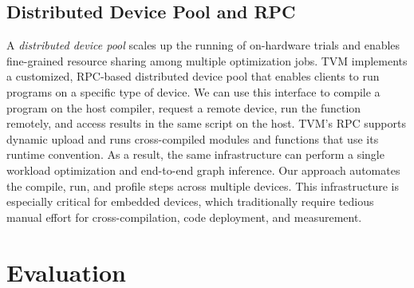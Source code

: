 \documentclass[letterpaper,twocolumn,10pt]{article}
\newcommand{\precap}{\vskip -0mm}
\newcommand{\postcap}{\vskip -0mm}
\newcommand{\TensorOpt}{TVM\xspace}
\begin{document}
\subsection{Distributed Device Pool and RPC}

A \textit{distributed device pool} scales up the running of on-hardware trials and enables fine-grained resource sharing among multiple optimization jobs.
\TensorOpt implements a customized, RPC-based distributed device pool that enables clients to run programs on a specific type of device.
We can use this interface to compile a program on the host compiler, request a remote device,
run the function remotely, and access results in the same script on the host.
\TensorOpt's RPC supports dynamic upload and runs cross-compiled modules and functions that use its runtime convention.
As a result, the same infrastructure can perform a single workload optimization and end-to-end graph inference.
Our approach automates the compile, run, and profile steps across multiple devices.
This infrastructure is especially critical for embedded devices,
which traditionally require tedious manual effort for cross-compilation, code deployment, and measurement.

\section{Evaluation}
\label{sec:exp}
\end{document}
